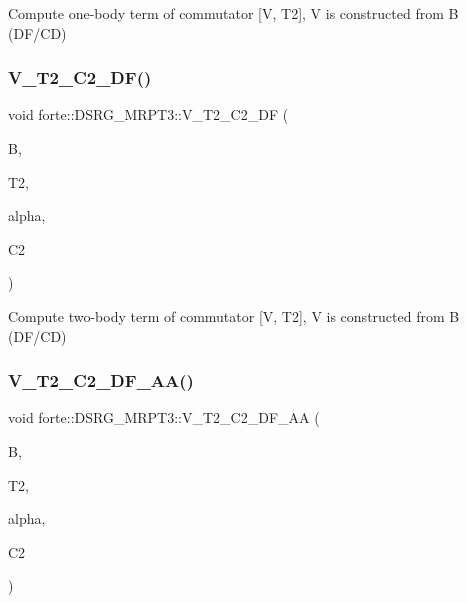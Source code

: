 Compute one-\/body term of commutator \mbox{[}V, T2\mbox{]}, V is constructed from B (D\+F/\+CD) 

\mbox{\label{classforte_1_1_d_s_r_g___m_r_p_t3_ab71c3b2fafa76b719d08acb4000d527b}} 
\subsubsection{\texorpdfstring{V\+\_\+\+T2\+\_\+\+C2\+\_\+\+D\+F()}{V\_T2\_C2\_DF()}}
{\footnotesize\ttfamily void forte\+::\+D\+S\+R\+G\+\_\+\+M\+R\+P\+T3\+::\+V\+\_\+\+T2\+\_\+\+C2\+\_\+\+DF (\begin{DoxyParamCaption}\item[{Blocked\+Tensor \&}]{B,  }\item[{Blocked\+Tensor \&}]{T2,  }\item[{const double \&}]{alpha,  }\item[{Blocked\+Tensor \&}]{C2 }\end{DoxyParamCaption})\hspace{0.3cm}{\ttfamily [protected]}}



Compute two-\/body term of commutator \mbox{[}V, T2\mbox{]}, V is constructed from B (D\+F/\+CD) 

\mbox{\label{classforte_1_1_d_s_r_g___m_r_p_t3_a48e6f20b01fa4ebdf3fcb3b2444b8443}} 
\subsubsection{\texorpdfstring{V\+\_\+\+T2\+\_\+\+C2\+\_\+\+D\+F\+\_\+\+A\+A()}{V\_T2\_C2\_DF\_AA()}}
{\footnotesize\ttfamily void forte\+::\+D\+S\+R\+G\+\_\+\+M\+R\+P\+T3\+::\+V\+\_\+\+T2\+\_\+\+C2\+\_\+\+D\+F\+\_\+\+AA (\begin{DoxyParamCaption}\item[{Blocked\+Tensor \&}]{B,  }\item[{Blocked\+Tensor \&}]{T2,  }\item[{const double \&}]{alpha,  }\item[{Blocked\+Tensor \&}]{C2 }\end{DoxyParamCaption})\hspace{0.3cm}{\ttfamily [protected]}}


